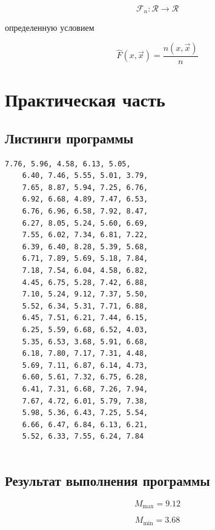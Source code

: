 \documentclass[12pt, a4paper]{report}
\begin{document}
	\begin{equation*}
	\mathcal{F}_n: \mathcal{R} \to \mathcal{R}
	\end{equation*}
	
	\hspace{1cm} определенную условием
	
	\begin{equation*}
		\hat F(x, \vec{x}) = \frac{n(x, \vec{x})}{n}
	\end{equation*}
	
	
	\newpage
	
	\section{Практическая часть}
	
	\subsection{Листинги программы}
	\begin{lstlisting}[caption=Содержимое генеральной совокупности X]
	7.76, 5.96, 4.58, 6.13, 5.05,
	6.40, 7.46, 5.55, 5.01, 3.79,
	7.65, 8.87, 5.94, 7.25, 6.76,
	6.92, 6.68, 4.89, 7.47, 6.53,
	6.76, 6.96, 6.58, 7.92, 8.47,
	6.27, 8.05, 5.24, 5.60, 6.69,
	7.55, 6.02, 7.34, 6.81, 7.22, 
	6.39, 6.40, 8.28, 5.39, 5.68, 
	6.71, 7.89, 5.69, 5.18, 7.84, 
	7.18, 7.54, 6.04, 4.58, 6.82, 
	4.45, 6.75, 5.28, 7.42, 6.88, 
	7.10, 5.24, 9.12, 7.37, 5.50, 
	5.52, 6.34, 5.31, 7.71, 6.88, 
	6.45, 7.51, 6.21, 7.44, 6.15, 
	6.25, 5.59, 6.68, 6.52, 4.03, 
	5.35, 6.53, 3.68, 5.91, 6.68, 
	6.18, 7.80, 7.17, 7.31, 4.48, 
	5.69, 7.11, 6.87, 6.14, 4.73, 
	6.60, 5.61, 7.32, 6.75, 6.28, 
	6.41, 7.31, 6.68, 7.26, 7.94, 
	7.67, 4.72, 6.01, 5.79, 7.38, 
	5.98, 5.36, 6.43, 7.25, 5.54, 
	6.66, 6.47, 6.84, 6.13, 6.21, 
	5.52, 6.33, 7.55, 6.24, 7.84
	
	\end{lstlisting}
	
	
	\vspace{0.5cm}
	\subsection{Результат выполнения программы}
	
	\begin{equation*}
	M_{\max} = 9.12
	\end{equation*}
	
	\begin{equation*}
	M_{\min} = 3.68
	\end{equation*}
	
\end{document}
